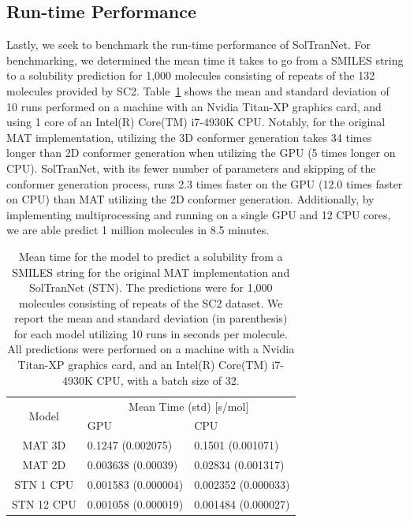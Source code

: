 \documentclass[journal=jmcmar,manuscript=article]{achemso}
\begin{document}
\subsection{Run-time Performance}

Lastly, we seek to benchmark the run-time performance of SolTranNet.
For benchmarking, we determined the mean time it takes to go from a SMILES string to a solubility prediction for 1,000 molecules consisting of repeats of the 132 molecules provided by SC2.
Table~\ref{tab:timings} shows the mean and standard deviation of 10 runs performed on a machine with an Nvidia Titan-XP graphics card, and using 1 core of an Intel(R) Core(TM) i7-4930K CPU.
Notably, for the original MAT implementation, utilizing the 3D conformer generation takes 34 times longer than 2D conformer generation when utilizing the GPU (5 times longer on CPU).
SolTranNet, with its fewer number of parameters and skipping of the conformer generation process, runs 2.3 times faster on the GPU (12.0 times faster on CPU) than MAT utilizing the 2D conformer generation.
Additionally, by implementing multiprocessing and running on a single GPU and 12 CPU cores, we are able predict 1 million molecules in 8.5 minutes.

\begin{table}
    \begin{tabular}{|c|l|l|}
        \hline
        \multirow{2}{*}{Model}    & \multicolumn{2}{c|}{Mean Time (std) [s/mol]} \\ 
        \cline{2-3}
          &  GPU & CPU \\
         \hline
         MAT 3D & 0.1247 (0.002075) & 0.1501 (0.001071) \\
         MAT 2D & 0.003638 (0.00039) & 0.02834 (0.001317) \\
         STN 1 CPU & 0.001583 (0.000004) & 0.002352 (0.000033)\\
         STN 12 CPU & 0.001058 (0.000019) & 0.001484 (0.000027)\\
         \hline
    \end{tabular}
    \caption{Mean time for the model to predict a solubility from a SMILES string for the original MAT implementation and SolTranNet (STN). The predictions were for 1,000 molecules consisting of repeats of the SC2 dataset. We report the mean and standard deviation (in parenthesis) for each model utilizing 10 runs in seconds per molecule. All predictions were performed on a machine with a Nvidia Titan-XP graphics card, and an Intel(R) Core(TM) i7-4930K CPU, with a batch size of 32.}
    \label{tab:timings}
\end{table}
\end{document}
